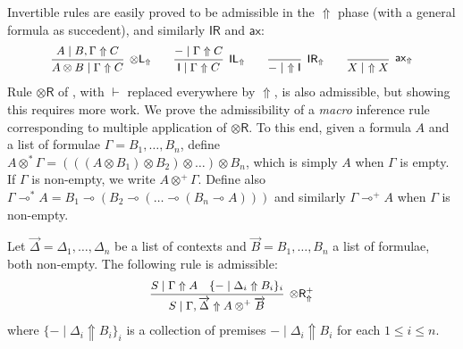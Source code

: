 \documentclass[runningheads]{llncs}
\renewcommand{\vec}{\overrightarrow}
\newcommand{\tl}{\otimes \mathsf{L}}
\newcommand{\tr}{\otimes \mathsf{R}}
\newcommand{\pass}{\mathsf{pass}}
\newcommand{\unitl}{\mathsf{IL}}
\newcommand{\unitr}{\mathsf{IR}}
\newcommand{\otL}{\tl}
\newcommand{\otR}{\tr}
\newcommand{\IL}{\unitl}
\newcommand{\IR}{\unitr}
\newcommand{\ax}{\mathsf{ax}}
\newcommand{\ot}{\otimes}
\newcommand{\lolli}{\multimap}
\newcommand{\I}{\mathsf{I}}
\newcommand{\up}{\Uparrow}
\begin{document}
Invertible rules are easily proved to be admissible in the $\up$ phase (with a general formula as succedent), and similarly $\IR$ and  $\ax$:
  \begin{equation}\label{eq:inv}
  \small
  \begin{array}{c}
    \infer[\otL_\up]{A \ot B \mid \Gamma \up C}{A \mid  B , \Gamma \up C}
    \qquad
    \infer[\IL_\up]{\I \mid \Gamma \up C}{- \mid \Gamma \up C}
    \qquad
    \infer[\IR_\up]{- \mid ~ \up \I}{}
    \qquad
    \infer[\ax_\up]{X \mid ~ \up X}{}    
  \end{array}
  \end{equation}
Rule $\otR$ of , with $\vdash$ replaced everywhere by $\up$, is also admissible, but showing this requires more work. We prove the admissibility of a \emph{macro} inference rule corresponding to multiple application of $\otR$. To this end, given a formula $A$ and a list of formulae $\Gamma = B_1,\dots,B_n$, define $A \ot^* \Gamma = (((A \ot B_1) \ot B_2) \ot \dots) \ot B_n$, which is simply $A$ when $\Gamma$ is empty. If $\Gamma$ is non-empty, we write $A \ot^+ \Gamma$. Define also $\Gamma \lolli^* A = B_1 \lolli (B_2 \lolli (\dots \lolli (B_n \lolli A)))$ and similarly $\Gamma\lolli^+ A$ when $\Gamma$ is non-empty.
\begin{proposition}\label{prop:otR}
  Let $\vec{\Delta} = \Delta_1,\dots,\Delta_n$ be a list of contexts and $\vec{B} = B_1,\dots,B_n$ a list of formulae, both non-empty.
  The following rule is admissible:
  \begin{equation*}\label{eq:otR}  
  \small
  \begin{array}{c}
    \infer[\otR^+_\up]{S \mid \Gamma , \vec{\Delta} \up A \ot^+ \vec{B}}{
      S \mid \Gamma \up A
      &
      \{ - \mid \Delta_i \up B_i \}_{i}
    }
  \end{array}
  \end{equation*}
  where $\{ - \mid \Delta_i \up B_i \}_{i}$ is a collection of premises $- \mid \Delta_i \up B_i$ for each $1 \le i \le n$.
\end{proposition}
\end{document}
